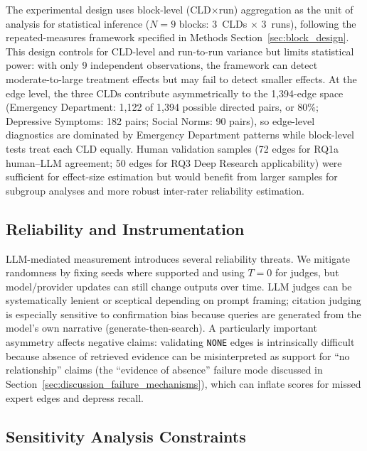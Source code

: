 The experimental design uses block-level (CLD$\times$run) aggregation as the unit of analysis for statistical inference ($N=9$ blocks: 3~CLDs $\times$ 3~runs), following the repeated-measures framework specified in Methods Section~\ref{sec:block_design}. This design controls for CLD-level and run-to-run variance but limits statistical power: with only 9 independent observations, the framework can detect moderate-to-large treatment effects but may fail to detect smaller effects. At the edge level, the three CLDs contribute asymmetrically to the 1,394-edge space (Emergency Department: 1,122 of 1,394 possible directed pairs, or 80\%; Depressive Symptoms: 182 pairs; Social Norms: 90 pairs), so edge-level diagnostics are dominated by Emergency Department patterns while block-level tests treat each CLD equally. Human validation samples (72 edges for RQ1a human--LLM agreement; 50 edges for RQ3 Deep Research applicability) were sufficient for effect-size estimation but would benefit from larger samples for subgroup analyses and more robust inter-rater reliability estimation.

\subsection{Reliability and Instrumentation}

LLM-mediated measurement introduces several reliability threats. We mitigate randomness by fixing seeds where supported and using $T{=}0$ for judges, but model/provider updates can still change outputs over time. LLM judges can be systematically lenient or sceptical depending on prompt framing; citation judging is especially sensitive to confirmation bias because queries are generated from the model's own narrative (generate-then-search). A particularly important asymmetry affects negative claims: validating \texttt{NONE} edges is intrinsically difficult because absence of retrieved evidence can be misinterpreted as support for ``no relationship'' claims (the ``evidence of absence'' failure mode discussed in Section~\ref{sec:discussion_failure_mechanisms}), which can inflate scores for missed expert edges and depress recall.

\subsection{Sensitivity Analysis Constraints}

